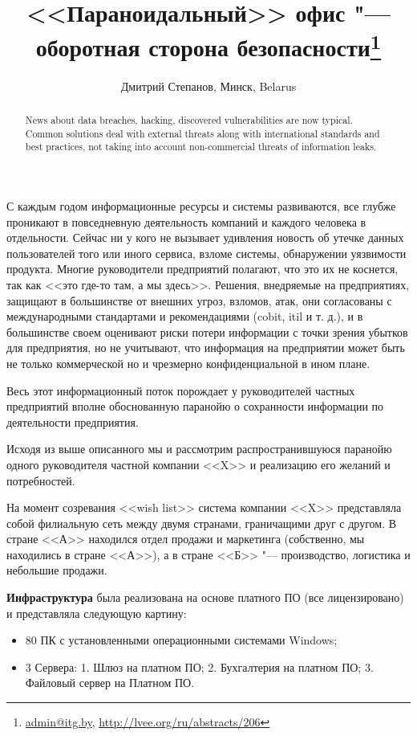 \documentclass[10pt, a5paper]{article}
\begin{document}
\title{<<Параноидальный>> офис "---  оборотная сторона безопасности\footnote{\url{admin@itg.by}, \url{http://lvee.org/ru/abstracts/206}}}
\author{Дмитрий Степанов, Минск, Belarus}
\maketitle
\begin{abstract}
News about data breaches, hacking, discovered vulnerabilities are now typical. Common solutions deal with external threats along with international standards and best practices, not taking into account non-commercial threats of information leaks.
\end{abstract}
С каждым годом информационные ресурсы и системы развиваются, все глубже проникают в повседневную деятельность компаний и каждого человека в отдельности. Сейчас ни у кого не вызывает удивления новость об утечке данных пользователей того или иного сервиса, взломе системы, обнаружении уязвимости продукта. Многие руководители предприятий полагают, что это их не коснется, так как <<это где-то там, а мы здесь>>. Решения, внедряемые на предприятиях, защищают в большинстве от внешних угроз, взломов, атак, они согласованы с международными стандартами и рекомендациями (cobit, itil и т. д.), и в большинстве своем оценивают риски потери информации с точки зрения  убытков для предприятия, но не учитывают, что информация на предприятии может быть не только коммерческой но и чрезмерно конфиденциальной в ином плане.

Весь этот информационный поток порождает у руководителей частных предприятий вполне обоснованную паранойю о сохранности информации по деятельности предприятия.

Исходя из выше описанного мы и рассмотрим распространившуюся паранойю одного руководителя частной компании <<X>>  и реализацию его желаний и потребностей.

На момент созревания <<wish list>> система компании <<X>> представляла собой филиальную сеть между двумя странами, граничащими друг с другом. В стране <<А>> находился отдел продажи и маркетинга (собственно, мы находились в стране <<А>>), а в стране <<Б>> "--- производство, логистика и небольшие продажи.

\textbf{Инфраструктура} была реализована на основе платного ПО (все лицензировано) и представляла следующую картину:

\begin{itemize}
  \item 80 ПК с установленными операционными системами Windows;
  \item 3 Сервера: 1. Шлюз на платном ПО; 2. Бухгалтерия на платном ПО; 3. Файловый сервер на Платном ПО.
\end{itemize}
\end{document}
